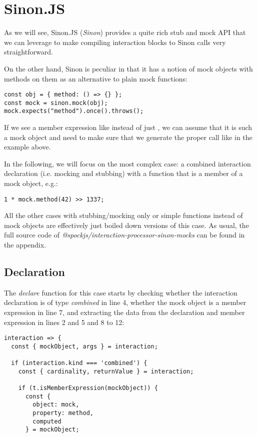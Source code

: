 \section{Sinon.JS}
As we will see,
Sinon.JS (\textit{Sinon}) provides a
quite rich stub and mock API
that we can leverage to make
compiling interaction blocks
to Sinon calls very straightforward.

On the other hand,
Sinon is peculiar in that it has a notion of
mock objects with methods on them
as an alternative to plain mock functions:
\autocite{SinonMockDoc}
\begin{verbatim}
const obj = { method: () => {} };
const mock = sinon.mock(obj);
mock.expects("method").once().throws();
\end{verbatim}
If we see a member expression like
instead of just
,
we can assume that it is such a mock object
and need to make sure that
we generate the proper  call
like in the example above.

In the following,
we will focus on the most complex case:
a combined interaction declaration
(i.e. mocking and stubbing) with a
function that is a member of a mock object, e.g.:
\begin{verbatim}
1 * mock.method(42) >> 1337;
\end{verbatim}
All the other cases with
stubbing/mocking only
or simple functions
instead of mock objects
are effectively just
boiled down versions of this case.
As usual, the full source code of
\textit{@spockjs/interaction-processor-sinon-mocks}
can be found in the appendix.

\subsection{Declaration}
The \textit{declare} function for this case starts by
checking whether the interaction declaration is of type \textit{combined} in line 4,
whether the mock object is a member expression in line 7, and
extracting the data from the declaration and member expression
in lines 2 and 5 and 8 to 12:
\begin{verbatim}
interaction => {
  const { mockObject, args } = interaction;

  if (interaction.kind === 'combined') {
    const { cardinality, returnValue } = interaction;

    if (t.isMemberExpression(mockObject)) {
      const {
        object: mock,
        property: method,
        computed
      } = mockObject;
\end{verbatim}

